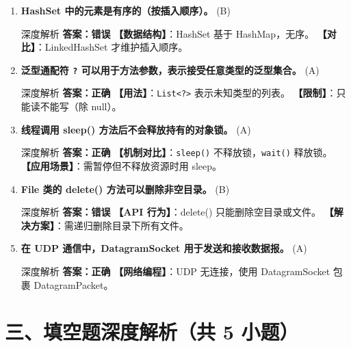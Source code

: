 ﻿\documentclass[12pt, a4paper]{ctexart}
\newcommand{\code}[1]{\texttt{#1}}
\newcommand{\tfblank}{\underline{\hspace{1.5em}}}
\begin{document}
\begin{enumerate}[label=\textbf{\arabic*.}, itemsep=1em]
	\item \textbf{HashSet 中的元素是有序的（按插入顺序）。} \tfblank (B)
	      \begin{bluebox}{深度解析}
		      \textbf{答案：错误}
		      \textbf{【数据结构】}：HashSet 基于 HashMap，无序。
		      \textbf{【对比】}：LinkedHashSet 才维护插入顺序。
	      \end{bluebox}

	\item \textbf{泛型通配符 \code{?} 可以用于方法参数，表示接受任意类型的泛型集合。} \tfblank (A)
	      \begin{bluebox}{深度解析}
		      \textbf{答案：正确}
		      \textbf{【用法】}：\code{List<?>} 表示未知类型的列表。
		      \textbf{【限制】}：只能读不能写（除 null）。
	      \end{bluebox}

	\item \textbf{线程调用 sleep() 方法后不会释放持有的对象锁。} \tfblank (A)
	      \begin{bluebox}{深度解析}
		      \textbf{答案：正确}
		      \textbf{【机制对比】}：\code{sleep()} 不释放锁，\code{wait()} 释放锁。
		      \textbf{【应用场景】}：需暂停但不释放资源时用 sleep。
	      \end{bluebox}

	\item \textbf{File 类的 delete() 方法可以删除非空目录。} \tfblank (B)
	      \begin{bluebox}{深度解析}
		      \textbf{答案：错误}
		      \textbf{【API 行为】}：delete() 只能删除空目录或文件。
		      \textbf{【解决方案】}：需递归删除目录下所有文件。
	      \end{bluebox}

	\item \textbf{在 UDP 通信中，DatagramSocket 用于发送和接收数据报。} \tfblank (A)
	      \begin{bluebox}{深度解析}
		      \textbf{答案：正确}
		      \textbf{【网络编程】}：UDP 无连接，使用 DatagramSocket 包裹 DatagramPacket。
	      \end{bluebox}
\end{enumerate}

\section*{三、填空题深度解析（共 5 小题）}
\end{document}
